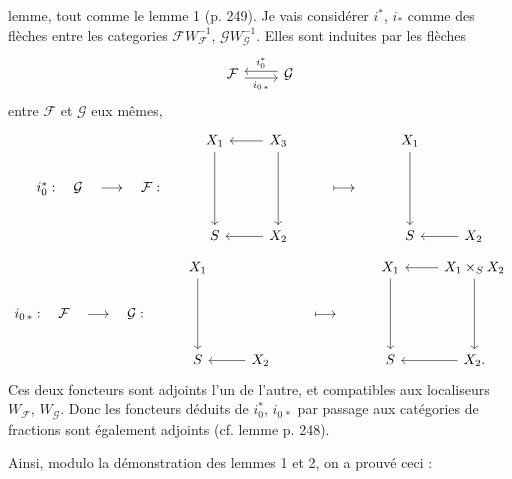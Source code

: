 \documentclass[11pt]{article}
\newcommand{\printedpage}[1]{\marginpar{\footnotesize p.~#1}}
\newcommand{\msp}[1]{\marginpar{\footnotesize [#1]}}
\begin{document}
lemme, tout comme le lemme 1 (p. 249). Je vais considérer $i^*$, $i_*$ comme des flèches entre les categories $\mathcal{F}W_{\mathcal{F}}^{-1}$, $\mathcal{G}W_{\mathcal{G}}^{-1}$. Elles sont induites par les flèches %
\[
\begin{tikzcd}[ampersand replacement=\&]
\mathcal{F} \arrow[r, shift right, "i_{0\,*}"'] \& \mathcal{G} \arrow[l, shift right, "i_0^*"']
\end{tikzcd}
\]
entre $\mathcal{F}$ et $\mathcal{G}$ eux mêmes, %
\[
\begin{tikzcd}[ampersand replacement=\&]
 \& X_1 \arrow[dd] \& X_3 \arrow[l] \arrow[dd] \& \& X_1 \arrow[dd] \& \\
i_0^* :\quad \mathcal{G}\quad\longrightarrow\quad\mathcal{F} : \& \& \& \longmapsto \& \& \\
 \& S \& X_2 \arrow[l] \& \& S \& X_2 \arrow[l]
\end{tikzcd}
\]
\[
\begin{tikzcd}[ampersand replacement=\&]
 \& X_1 \arrow[dd] \& \& \& X_1 \arrow[dd] \& X_1\times_S X_2 \arrow[l] \arrow[dd] \\
i_{0\,*} :\quad \mathcal{F}\quad\longrightarrow\quad\mathcal{G} : \& \& \& \longmapsto \& \& \\
 \& S \& X_2 \arrow[l] \& \& S \& X_2. \arrow[l]
\end{tikzcd}
\]
Ces deux foncteurs sont adjoints l'un de l'autre, et compatibles aux localiseurs $W_{\mathcal{F}}$, $W_{\mathcal{G}}$. Donc les foncteurs déduits de $i_0^*$, $i_{0\,*}$ par passage aux catégories de fractions sont également adjoints (cf. lemme p. 248).

Ainsi, modulo la démonstration des lemmes 1 et 2, on a prouvé ceci :

\printedpage{164}

\msp{page 253}
\end{document}
